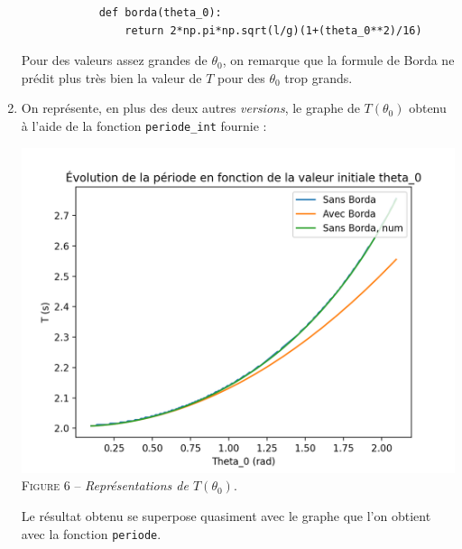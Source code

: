 \documentclass[17pt]{article}
\newcommand{\f}[1]{\texttt{#1}}
\begin{document}
\begin{enumerate}[start=5]
		\begin{lstlisting}
			def borda(theta_0):
			    return 2*np.pi*np.sqrt(l/g)(1+(theta_0**2)/16)
		\end{lstlisting}
		Pour des valeurs assez grandes de $\theta_0$, on remarque que la formule de Borda ne prédit plus très bien la valeur de $T$ pour des $\theta_0$ trop grands.
		\item On représente, en plus des deux autres \textit{versions}, le graphe de $T(\theta_0)$ obtenu à l'aide de la fonction \f{periode\_int} fournie :
		\begin{center}
			\includegraphics[scale=0.4]{./img/question12.png}\\
			\textsc{Figure 6 – } \textit{Représentations de $T(\theta_0)$}.
		\end{center}
		Le résultat obtenu se superpose quasiment avec le graphe que l'on obtient avec la fonction \f{periode}.
	\end{enumerate}
\end{document}
